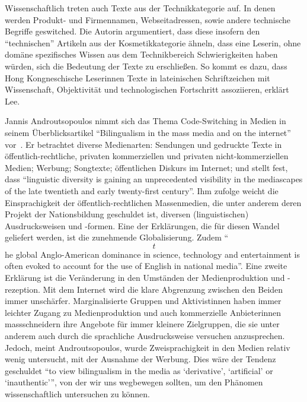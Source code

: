 Wissenschaftlich treten auch Texte aus der Technikkategorie auf.
In denen werden Produkt- und Firmennamen, Webseitadressen, sowie andere technische Begriffe geswitched.
Die Autorin argumentiert, dass diese insofern den ``technischen'' Artikeln aus der Kosmetikkategorie ähneln, dass eine Leserin, ohne domäne spezifisches Wissen aus dem Technikbereich Schwierigkeiten haben würden, sich die Bedeutung der Texte zu erschließen.
So kommt es dazu, dass Hong Kongneschische Leserinnen Texte in lateinischen Schriftzeichen mit Wissenschaft, Objektivität und technologischen Fortschritt assoziieren, erklärt Lee.


Jannis Androutsopoulos nimmt sich das Thema Code-Switching in Medien in seinem Überblicksartikel ``Bilingualism in the mass media and on the internet'' vor~\cite[]{Andr07}.
Er betrachtet diverse Medienarten: Sendungen und gedruckte Texte in öffentlich-rechtliche, privaten kommerziellen und privaten nicht-kommerziellen Medien; Werbung; Songtexte; öffentlichen Diskurs im Internet;
und stellt fest, dass ``linguistic diversity is gaining an unprecedented visibility in the mediascapes of the late twentieth and early twenty-first century''.
Ihm zufolge weicht die Einsprachigkeit der öffentlich-rechtlichen Massenmedien, die unter anderem deren Projekt der Nationsbildung geschuldet ist, diversen (linguistischen) Ausdrucksweisen und -formen.
Eine der Erklärungen, die für diesen Wandel geliefert werden, ist die zunehmende Globalisierung.
Zudem ``\[t\]he global Anglo-American dominance in science, technology and entertainment is often evoked to account for the use of English in national media''.
Eine zweite Erklärung ist die Veränderung in den Umständen der Medienproduktion und -rezeption.
Mit dem Internet wird die klare Abgrenzung zwischen den Beiden immer unschärfer.
Marginalisierte Gruppen und Aktivistinnen haben immer leichter Zugang zu Medienproduktion und auch kommerzielle Anbieterinnen massschneidern ihre Angebote für immer kleinere Zielgruppen, die sie unter anderem auch durch die sprachliche Ausdrucksweise versuchen anzusprechen.
Jedoch, meint Androutsopoulos, wurde Zweisprachigkeit in den Medien relativ wenig untersucht, mit der Ausnahme der Werbung.
Dies wäre der Tendenz geschuldet ``to view bilingualism in the media as ‘derivative’, ‘artificial’ or ‘inauthentic’'', %
von der wir uns wegbewegen sollten, um den Phänomen wissenschaftlich untersuchen zu können.


